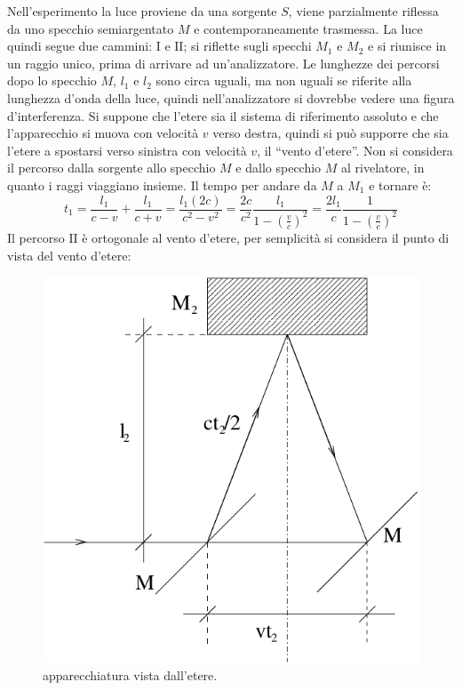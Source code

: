 Nell'esperimento la luce proviene da una sorgente $S$, viene parzialmente riflessa da uno specchio semiargentato $M$ e contemporaneamente trasmessa. La luce quindi segue due cammini: $\text{I}$ e $\text{II}$; si riflette sugli specchi $M_1$ e $M_2$ e si riunisce in un raggio unico, prima di arrivare ad un'analizzatore. Le lunghezze dei percorsi dopo lo specchio $M$, $l_1$ e $l_2$ sono circa uguali, ma non uguali se riferite alla lunghezza d'onda della luce, quindi nell'analizzatore si dovrebbe vedere una figura d'interferenza. Si suppone che l'etere sia il sistema di riferimento assoluto e che l'apparecchio si muova con velocità $v$ verso destra, quindi si può supporre che sia l'etere a spostarsi verso sinistra con velocità $v$, il ``vento d'etere''. Non si considera il percorso dalla sorgente allo specchio $M$ e dallo specchio $M$ al rivelatore, in quanto i raggi viaggiano insieme. Il tempo per andare da $M$ a $M_1$ e tornare è:
\[t_1=\frac{l_1}{c-v}+\frac{l_1}{c+v}=\frac{l_1(2c)}{c^2-v^2}=\frac{2c}{c^2}\frac{l_1}{1-\left(\frac{v}{c}\right)^2}=\frac{2l_1}{c}\frac{1}{1-\left(\frac{v}{c}\right)^2}\]
Il percorso $\text{II}$ è ortogonale al vento d'etere, per semplicità si considera il punto di vista del vento d'etere:
\begin{figure}[htbp]
\centering
\includegraphics[scale=0.8]{immagini/fisica1/Morley2}
\caption{apparecchiatura vista dall'etere.}
\end{figure}

